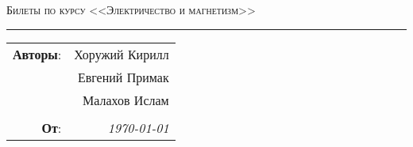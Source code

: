 
\begin{center}
    \LARGE \textsc{Билеты по курсу <<Электричество и магнетизм>>}
\end{center}

\hrule

\phantom{42}

\begin{flushright}
    \begin{tabular}{rr}
        \textbf{Авторы}: 
        & Хоружий Кирилл \\
        & Евгений Примак \\
        & Малахов Ислам \\
        &\\
        \textbf{От}: &
        \textit{\today}\\
    \end{tabular}
\end{flushright}

\thispagestyle{empty}
\tableofcontents
\newpage
